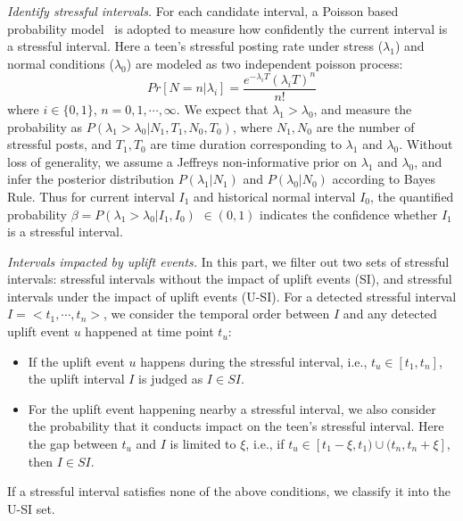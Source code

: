 \emph{Identify stressful intervals.}
For each candidate interval,
a Poisson based probability model~\cite{Li2017Analyzing} is adopted to measure how confidently the current interval is a stressful interval.
Here a teen's stressful posting rate under stress ($\lambda_1$) and normal conditions ($\lambda_0$) are modeled as two independent poisson process:
\begin{equation}
Pr[N=n|\lambda_i]=\frac{e^{-\lambda_i T}{(\lambda_i T)}^n}{n!}
\end{equation}
where $i\in\{0,1\}$, $n=0,1,\cdots,\infty$.
We expect that $\lambda_1 > \lambda_0$, and measure the probability as $P(\lambda_1>\lambda_0|N_1, T_1, N_0, T_0)$,
where $N_1, N_0$ are the number of stressful posts, and $T_1, T_0$ are time duration corresponding to $\lambda_1$ and $\lambda_0$.
Without loss of generality, we assume a Jeffreys non-informative prior on $\lambda_1$ and $\lambda_0$,
and infer the posterior distribution $P(\lambda_1|N_1)$ and $P(\lambda_0|N_0)$ according to Bayes Rule.
Thus for current interval $I_1$ and historical normal interval $I_0$,
the quantified probability $\beta = P(\lambda_1>\lambda_0|I_1,I_0)$ $\in (0,1)$ indicates the confidence whether $I_1$ is a stressful interval.

\emph{Intervals impacted by uplift events.}
In this part, we filter out two sets of stressful intervals: stressful intervals without the impact of uplift events (SI),
and stressful intervals under the impact of uplift events (U-SI).
For a detected stressful interval $I = <t_1,\cdots,t_n>$, we consider the temporal order between $I$ and any detected uplift event $u$ happened at time point $t_u$:
\begin{itemize}
\item If the uplift event $u$ happens during the stressful interval, i.e., $t_u \in [t_1,t_n]$, the uplift interval $I$ is judged as $I \in SI$.
\item For the uplift event happening nearby a stressful interval,
we also consider the probability that it conducts impact on the teen's stressful interval.
Here the gap between $t_u$ and $I$ is limited to $\xi$, i.e.,
if $t_u \in [t_{1}-\xi, t_1)\cup(t_{n},t_{n}+\xi]$, then $I \in SI$.
\end{itemize}
If a stressful interval satisfies none of the above conditions, we classify it into the U-SI set.